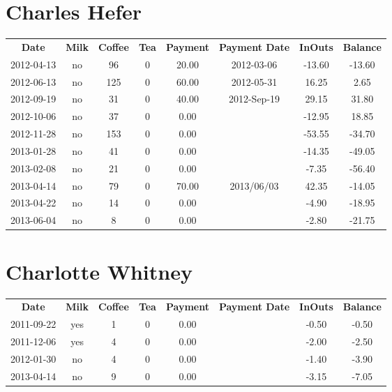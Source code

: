 \section{Charles Hefer}

\begin{center}
\begin{tabular}{cccccccc}
\textbf{Date} & \textbf{Milk} & \textbf{Coffee} & \textbf{Tea} & \textbf{Payment} & \textbf{Payment Date} & \textbf{InOuts} & \textbf{Balance} \\
2012-04-13 & no &  96 & 0 & 20.00 & 2012-03-06 & -13.60 & -13.60\\ 
2012-06-13 & no & 125 & 0 & 60.00 & 2012-05-31 &  16.25 &   2.65\\ 
2012-09-19 & no &  31 & 0 & 40.00 & 2012-Sep-19 &  29.15 &  31.80\\ 
2012-10-06 & no &  37 & 0 &  0.00 &  & -12.95 &  18.85\\ 
2012-11-28 & no & 153 & 0 &  0.00 &  & -53.55 & -34.70\\ 
2013-01-28 & no &  41 & 0 &  0.00 &  & -14.35 & -49.05\\ 
2013-02-08 & no &  21 & 0 &  0.00 &  &  -7.35 & -56.40\\ 
2013-04-14 & no &  79 & 0 & 70.00 & 2013/06/03 &  42.35 & -14.05\\ 
2013-04-22 & no &  14 & 0 &  0.00 &  &  -4.90 & -18.95\\ 
2013-06-04 & no &   8 & 0 &  0.00 &  &  -2.80 & -21.75
\end{tabular}
\end{center}

\section{Charlotte Whitney}

\begin{center}
\begin{tabular}{cccccccc}
\textbf{Date} & \textbf{Milk} & \textbf{Coffee} & \textbf{Tea} & \textbf{Payment} & \textbf{Payment Date} & \textbf{InOuts} & \textbf{Balance} \\
2011-09-22 & yes & 1 & 0 & 0.00 &  & -0.50 & -0.50\\ 
2011-12-06 & yes & 4 & 0 & 0.00 &  & -2.00 & -2.50\\ 
2012-01-30 & no & 4 & 0 & 0.00 &  & -1.40 & -3.90\\ 
2013-04-14 & no & 9 & 0 & 0.00 &  & -3.15 & -7.05
\end{tabular}
\end{center}

